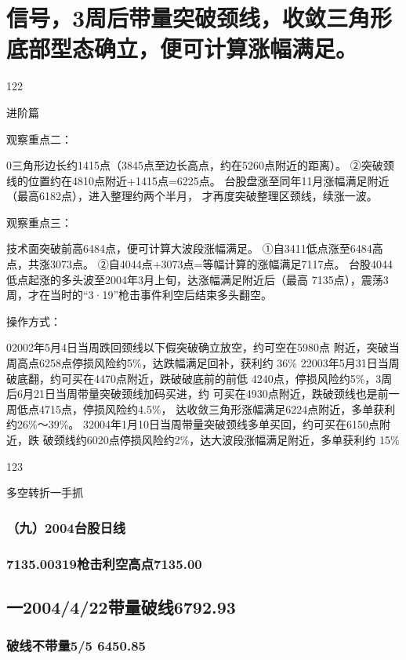 \documentclass{article}
\begin{document}
\section{信号，3周后带量突破颈线，收敛三角形底部型态确立，便可计算涨幅满足。}

122

\clearpage

进阶篇

观察重点二：

0三角形边长约1415点（3845点至边长高点，约在5260点附近的距离）。 ②突破颈线的位置约在4810点附近+1415点=6225点。 台股盘涨至同年11月涨幅满足附近（最高6182点），进入整理约两个半月， 才再度突破整理区颈线，续涨一波。

观察重点三：

技术面突破前高6484点，便可计算大波段涨幅满足。 ①自3411低点涨至6484高点，共涨3073点。 ②自4044点+3073点=等幅计算的涨幅满足7117点。 台股4044低点起涨的多头波至2004年3月上旬，达涨幅满足附近后（最高 7135点），震荡3周，才在当时的“3·19”枪击事件利空后结束多头翻空。

操作方式：

02002年5月4日当周跌回颈线以下假突破确立放空，约可空在5980点 附近，突破当周高点6258点停损风险约5\%，达跌幅满足回补，获利约 36\% 22003年5月31日当周破底翻，约可买在4470点附近，跌破破底前的前低 4240点，停损风险约5\%，3周后6月21日当周带量突破颈线加码买进，约 可买在4930点附近，跌破颈线也是前一周低点4715点，停损风险约4.5\%， 达收敛三角形涨幅满足6224点附近，多单获利约26\%～39\%。 32004年1月10日当周带量突破颈线多单买回，约可买在6150点附近，跌 破颈线约6020点停损风险约2\%，达大波段涨幅满足附近，多单获利约 15\%

123

\clearpage

多空转折一手抓

\subsubsection{（九）2004台股日线}

\subsubsection{7135.00319枪击利空高点7135.00}

\subsection{一2004/4/22带量破线6792.93}

\subsubsection{破线不带量5/5 6450.85}
\end{document}
